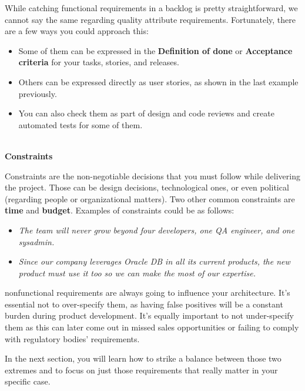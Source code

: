 While catching functional requirements in a backlog is pretty straightforward, we cannot say the same regarding quality attribute requirements. Fortunately, there are a few ways you could approach this:

\begin{itemize}
\item 
Some of them can be expressed in the \textbf{Definition of done} or \textbf{Acceptance criteria} for your tasks, stories, and releases.

\item 
Others can be expressed directly as user stories, as shown in the last example previously.

\item 
You can also check them as part of design and code reviews and create automated tests for some of them.

\end{itemize}

\hspace*{\fill} \\ %
\noindent
\textbf{Constraints}

Constraints are the non-negotiable decisions that you must follow while delivering the project. Those can be design decisions, technological ones, or even political (regarding people or organizational matters). Two other common constraints are \textbf{time} and \textbf{budget}. Examples of constraints could be as follows:


\begin{itemize}
\item 
\textit{The team will never grow beyond four developers, one QA engineer, and one sysadmin.}

\item 
\textit{Since our company leverages Oracle DB in all its current products, the new product must use it too so we can make the most of our expertise.
}

\end{itemize}

nonfunctional requirements are always going to influence your architecture. It's essential not to over-specify them, as having false positives will be a constant burden during product development. It's equally important to not under-specify them as this can later come out in missed sales opportunities or failing to comply with regulatory bodies' requirements.

In the next section, you will learn how to strike a balance between those two extremes and to focus on just those requirements that really matter in your specific case.





